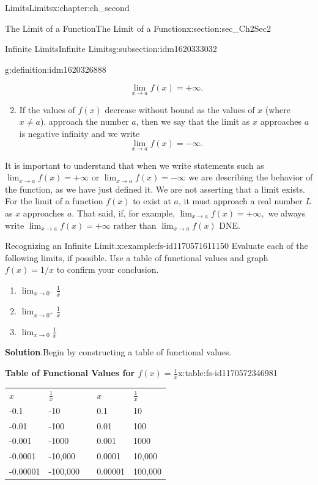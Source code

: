 \documentclass[oneside,10pt,]{book}
\newcommand{\blocktitlefont}{\relax}
\newcommand{\tabularfont}{\relax}
\numberwithin{equation}{section}
\begin{document}
\begin{chapterptx}{Limits}{}{Limits}{}{}{x:chapter:ch_second}
\begin{sectionptx}{The Limit of a Function}{}{The Limit of a Function}{}{}{x:section:sec_Ch2Sec2}
\begin{subsectionptx}{Infinite Limits}{}{Infinite Limits}{}{}{g:subsection:idm1620333032}
\begin{definition}{}{g:definition:idm1620326888}
\begin{enumerate}
\begin{equation*}
\lim_{x \to a} f(x)=+\infty.
\end{equation*}
%
\item{}If the values of \(f(x)\) decrease without bound as the values of \(x\) (where \(x \neq a \)). approach the number \(a \), then we say that the limit as \(x\) approaches \(a \) is negative infinity and we write%
\begin{equation*}
\lim_{x \to a} f(x)=-\infty.
\end{equation*}
%
\end{enumerate}
\end{definition}
It is important to understand that when we write statements such as \(\lim_{x \to a} f(x)=+\infty\) or \(\lim_{x \to a} f(x)=-\infty\) we are describing the behavior of the function, as we have just defined it. We are not asserting that a limit exists. For the limit of a function \(f(x)\) to exist at \(a \), it must approach a real number \(L \) as \(x\) approaches \(a \). That said, if, for example, \(\lim_{x \to a} f(x)=+\infty,\) we always write \(\lim_{x \to a} f(x)=+\infty\) rather than \(\lim_{x \to a} f(x)\) DNE.%
\begin{example}{Recognizing an Infinite Limit.}{x:example:fs-id1170571611150}%
Evaluate each of the following limits, if possible. Use a table of functional values and graph \(f(x)=1/x\) to confirm your conclusion.%
%
\begin{enumerate}
\item{}\(\displaystyle \lim_{x\to 0^- }\frac{1}{x}\)%
\item{}\(\displaystyle \lim_{x\to 0^+ }\frac{1}{x}\)%
\item{}\(\displaystyle \lim_{x\to0}\frac{1}{x}\)%
\end{enumerate}
\par\smallskip%
\noindent\textbf{\blocktitlefont Solution}.\hypertarget{g:solution:idm1620290664}{}\quad{}Begin by constructing a table of functional values.%
\begin{tableptx}{\textbf{Table of Functional Values for \(f(x)=\frac{1}{x}\)}}{x:table:fs-id1170572346981}{}%
\centering%
{\tabularfont%
\begin{tabular}{lllll}
\textbf{\(x\)}&\textbf{\(\frac{1}{x}\)}&\textbf{}&\textbf{\(x\)}&\textbf{\(\frac{1}{x}\)}\tabularnewline[0pt]
-0.1&-10&&0.1&10\tabularnewline[0pt]
-0.01&-100&&0.01&100\tabularnewline[0pt]
-0.001&-1000&&0.001&1000\tabularnewline[0pt]
-0.0001&-10,000&&0.0001&10,000\tabularnewline[0pt]
-0.00001&-100,000&&0.00001&100,000\tabularnewline[0pt]

\end{tabular}}
\end{tableptx}
\end{example}
\end{subsectionptx}
\end{sectionptx}
\end{chapterptx}
\end{document}
